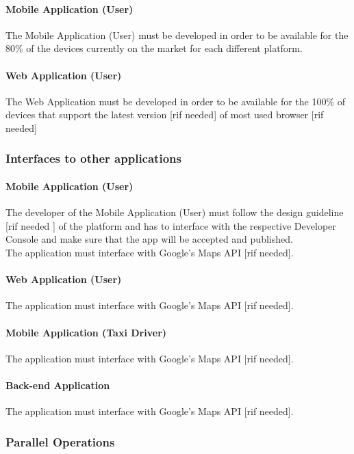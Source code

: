 \documentclass[12pt, a4paper]{article}
\begin{document}
\paragraph{Mobile Application (User)} 
The Mobile Application (User) must be developed in order to be available for the 80\% of the devices currently on the market for each different platform.
\paragraph{Web Application (User)}
The Web Application must be developed in order to be available for the 100\% of devices that support the latest version [rif needed] of most used browser [rif needed]


\subsubsection{Interfaces to other applications} 
\label{ssub:interfaces_to_other_applications}
\paragraph{Mobile Application (User)} 
\label{par:mobile_application_}
The developer of the Mobile Application (User) must follow the design guideline [rif needed ] of the platform and has to interface with the respective Developer Console and make sure that the app will be accepted and published. \\
The application must interface with Google's Maps API [rif needed].
\paragraph{Web Application (User)} 
The application must interface with Google's Maps API [rif needed].
\paragraph{Mobile Application (Taxi Driver)} 
The application must interface with Google's Maps API [rif needed].
\paragraph{Back-end Application} 
The application must interface with Google's Maps API [rif needed].

\subsubsection{Parallel Operations} 
\label{ssub:parrallel_operations}
\end{document}
